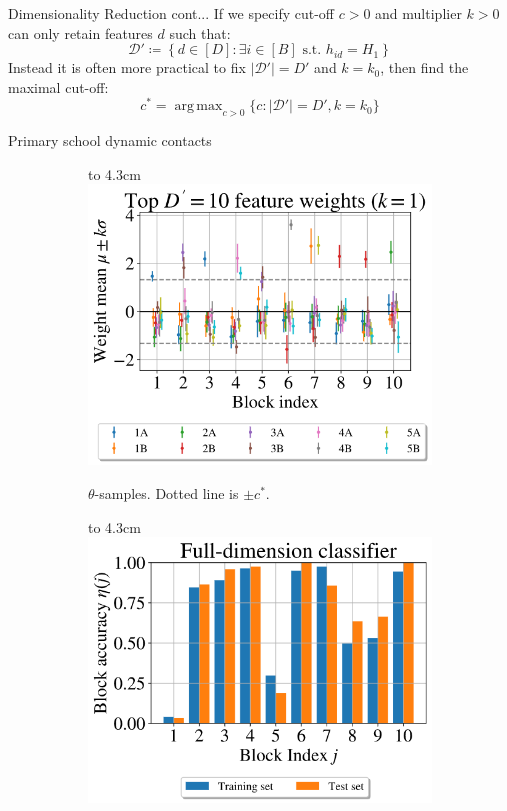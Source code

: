 \documentclass{beamer}
\newcommand{\Dcal}{\mathcal{D}}
\DeclareMathOperator*{\argmax}{arg\,max} %
\def\imagebox#1#2{\vtop to #1{\null\hbox{#2}\vfill}}
\begin{document}
	\begin{frame}{Dimensionality Reduction cont...}
		If we specify cut-off $c>0$ and multiplier $k>0$ can only retain features $d$ such that:
		$$\Dcal' \coloneqq \left\{ d \in [D] : \exists i \in [B] \textrm{ s.t. } h_{id} = H_1\right\}$$
		Instead it is often more practical to fix $|\Dcal'| = D'$ and $k=k_0$, then find the maximal cut-off:
		$$c^* = \argmax_{c>0}\{c: |\Dcal'|=D', k=k_0\}$$
	\end{frame}

	\begin{frame}{Primary school dynamic contacts \cite{schools}}
		\begin{figure}[!h]
			\centering
			\begin{subfigure}[t]{0.45\linewidth}
				\centering
				\imagebox{4.3cm}{\includegraphics[width=\linewidth]{school-null-1}}
				\caption{$\theta$-samples. Dotted line is $\pm c^*$.}
			\end{subfigure}
			\begin{subfigure}[t]{0.45\linewidth}
				\centering
				\imagebox{4.3cm}{\includegraphics[width=\linewidth]{school-accuracy-1}}
			\end{subfigure}
		\end{figure}
		

\end{frame}
\end{document}
